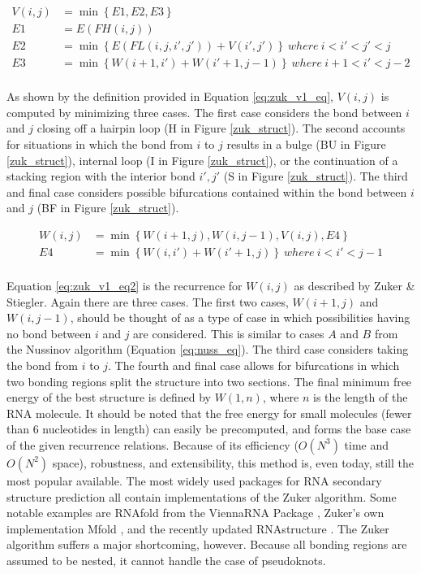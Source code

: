 \documentclass{cshonours}
\begin{document}
\begin{align} \label{eq:zuk_v1_eq}
	V(i, j) &= \min \left\lbrace E1, E2, E3 \right\rbrace \nonumber \\
	E1 &= E(FH(i, j)) \nonumber \\
	E2 &= \min \left\lbrace E(FL(i, j, i', j')) + V (i', j') \right\rbrace \: where \: i < i' < j' < j \nonumber \\
	E3 &= \min \left\lbrace W (i + 1, i') + W (i' + 1, j - 1) \right\rbrace \: where \: i + 1 < i' < j - 2 \nonumber \\
\end{align}


As shown by the definition provided in Equation \ref{eq:zuk_v1_eq}, $V (i, j)$ is computed by minimizing
three cases. The first case considers the bond between $i$ and $j$ closing off a hairpin
loop (H in Figure \ref{zuk_struct}). The second accounts for situations in which the bond from $i$ to $j$ results in a bulge (BU in Figure \ref{zuk_struct}), internal loop (I in Figure \ref{zuk_struct}), or the continuation of a stacking region with the
interior bond $i',j'$ (S in Figure \ref{zuk_struct}). The third and final case considers possible bifurcations contained within the bond between $i$ and $j$ (BF in Figure \ref{zuk_struct}).

\begin{align} \label{eq:zuk_v1_eq2}
	W (i, j) &= \min \left\lbrace W(i + 1, j), W(i, j - 1), V(i, j), E4 \right\rbrace \nonumber \\
	E4 &= \min \left\lbrace W (i, i') + W (i' + 1, j) \right\rbrace \: where \: i < i' < j - 1 \nonumber \\
\end{align}


Equation \ref{eq:zuk_v1_eq2} is the recurrence for $W(i, j)$ as described by Zuker \& Stiegler.
Again there are three cases. The first two cases, $W (i + 1, j)$ and $W(i, j - 1)$,
should be thought of as a type of case in which possibilities having no bond between $i$ and $j$ are considered. This is similar to cases $A$ and $B$ from the Nussinov algorithm (Equation \ref{eq:nuss_eq}). The third case considers taking the bond from
$i$ to $j$. The fourth and final case allows for bifurcations in which two bonding regions split
the structure into two sections. The final minimum free energy of the best structure is defined by $W(1, n)$, where $n$ is the length of the RNA molecule. It should
be noted that the free energy for small molecules (fewer than 6 nucleotides in length) can easily be
precomputed, and forms the base case of the given recurrence relations. Because of
its efficiency ($O(N^3)$ time and $O(N^2)$ space), robustness, and extensibility, this method is,
even today, still the most popular available. The most widely used packages for RNA secondary structure prediction all contain implementations of the Zuker algorithm. Some notable examples are RNAfold from the ViennaRNA Package \cite{lorenz2011viennarna}, Zuker's own implementation Mfold \cite{zuker2003mfold}, and the recently updated RNAstructure \cite{bellaousov2013rnastructure}. The Zuker algorithm suffers a major shortcoming, however. Because all bonding regions are assumed to be nested, it
cannot handle the case of pseudoknots. 
\end{document}
